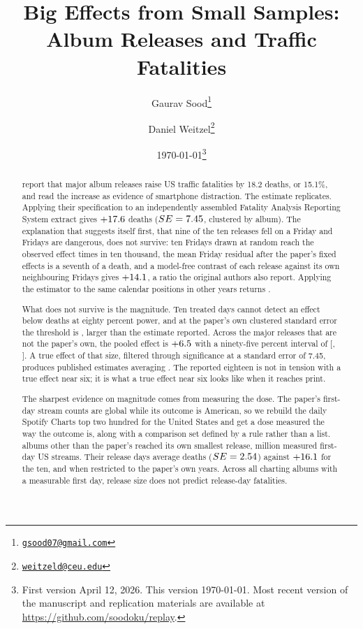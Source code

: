\documentclass[11pt]{article}
\title{Big Effects from Small Samples:\\
Album Releases and Traffic Fatalities}
\author{
Gaurav Sood\thanks{\href{mailto:gsood07@gmail.com}{\texttt{gsood07@gmail.com}}}
\and
Daniel Weitzel\thanks{\href{mailto:weitzeld@ceu.edu}{\texttt{weitzeld@ceu.edu}}}
}
\date{\today\thanks{First version April 12, 2026. This version \today. Most recent version of the manuscript and replication materials are available at \href{https://github.com/soodoku/replay}{https://github.com/soodoku/replay}.}}
\begin{document}
\maketitle

\vspace{0.5cm}

\begin{abstract}
\begin{singlespace}
\citet{patel2026smartphones} report that major album releases raise US traffic fatalities by
18.2 deaths, or 15.1\%, and read the increase as evidence of smartphone distraction. The estimate
replicates. Applying their specification to an independently assembled
Fatality Analysis Reporting System extract gives $+17.6$ deaths
($SE = 7.45$, clustered by album). The explanation that suggests itself first, that
nine of the ten releases fell on a Friday and Fridays are dangerous, does not survive: ten Fridays
drawn at random reach the observed effect \numFridayPlaceboDraws{} times in ten thousand, the mean
Friday residual after the paper's fixed effects is a seventh of a death, and a model-free contrast
of each release against its own neighbouring Fridays gives $+14.1$, a ratio
the original authors also report. Applying the estimator to the same calendar positions in other
years returns \numEffectCalendarPlacebo{}.

What does not survive is the magnitude. Ten treated days cannot detect an effect below
\numMDEEighty{} deaths at eighty percent power, and at the paper's own clustered standard error the
threshold is \numMDEEightyClustered{}, larger than the estimate reported. Across the
\numNOutsidePaper{} major releases that are not the paper's own, the pooled effect is
$+6.5$ with a ninety-five percent interval of
[\numCIOutsideLo, \numCIOutsideHi]. A true effect of that size, filtered through significance at a
standard error of 7.45, produces published estimates averaging \numMeanPublishedAtOutside{}. The
reported eighteen is not in tension with a true effect near six; it is what a true effect near six
looks like when it reaches print.

The sharpest evidence on magnitude comes from measuring the dose. The paper's first-day stream
counts are global while its outcome is American, so we rebuild the daily Spotify Charts top two
hundred for the United States and get a dose measured the way the outcome is, along with a
comparison set defined by a rule rather than a list. \numNDoseMatched{} albums other than the
paper's reached its own smallest release, \numDoseCut{} million measured first-day US streams.
Their release days average \numEffectDoseMatched{} deaths
($SE = 2.54$) against $+16.1$ for the ten, and
\numEffectDoseMatchedWindow{} when restricted to the paper's own years. Across all
\numNDoseAll{} charting albums with a measurable first day, release size does not predict
release-day fatalities.


\end{singlespace}
\end{abstract}
\end{document}
